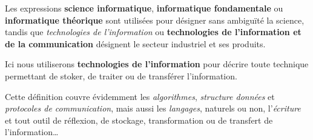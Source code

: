 \begin{coolquote}
Les expressions \textbf{science informatique}, \textbf{informatique fondamentale} ou \textbf{informatique théorique} sont utilisées pour désigner sans ambiguïté la science, tandis que \emph{technologies de l'information} ou \textbf{technologies de l'information et de la communication} désignent le secteur industriel et ses produits.
\end{coolquote}

Ici nous utiliserons \textbf{technologies de l'information} pour décrire toute technique permettant de stoker, de traiter ou de transférer l'information. 

Cette définition couvre évidemment les \emph{algorithmes}, \emph{structure données} et \emph{protocoles de communication}, mais aussi les \emph{langages}, naturels ou non, l'\emph{écriture} et tout outil de réflexion, de stockage, transformation ou de transfert de l'information\ldots